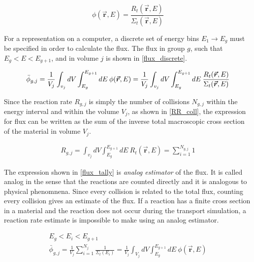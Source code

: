 \begin{equation}
\label{flux_from_RR}
\phi(\boldsymbol{\vec{r}},E) = \frac{ R_t(\boldsymbol{\vec{r}},E) }{  \Sigma_t(\boldsymbol{\vec{r}},E) }
\end{equation}

For a representation on a computer, a discrete set of energy bins $E_1 \rightarrow E_g$ must be specified in order to calculate the flux.  The flux in group $g$, such that $E_g < E < E_{g+1}$, and in volume $j$ is shown in \eqref{flux_discrete}.

\begin{equation}
\label{flux_discrete}
\bar{\phi}_{g,j} = \frac{1}{V_j} \int_{v_j} dV \int_{E_g}^{E_{g+1}} dE \: \phi(\boldsymbol{\vec{r}},E) = \frac{1}{V_j} \int_{v_j} dV \int_{E_g}^{E_{g+1}} dE \:\frac{ R_t(\boldsymbol{\vec{r}},E) }{  \Sigma_t(\boldsymbol{\vec{r}},E) } \\
\end{equation}

Since the reaction rate $R_{g,j}$ is simply the number of collisions $N_{g,j}$ within the energy interval and within the volume $V_j$, as shown in \eqref{RR_coll}, the expression for flux can be written as the sum of the inverse total macroscopic cross section of the material in volume $V_j$.

\begin{equation}
\label{RR_coll}
\begin{gathered}
R_{g,j} = \int_{v_j} dV \int_{E_g}^{E_{g+1}} dE \: R_t(\boldsymbol{\vec{r}},E) = \sum_{i=1}^{N_{g,j}} 1
\end{gathered}
\end{equation}

The expression shown in \eqref{flux_tally} is \emph{analog estimator} of the flux.  It is called analog in the sense that the reactions are counted directly and it is analogous to physical phenomnena.  Since every collision is related to the total flux, counting every collision gives an estimate of the flux.  If a reaction has a finite cross section in a material and the reaction does not occur during the transport simulation, a reaction rate estimate is impossible to make using an analog estimator. 

\begin{equation}
\label{flux_tally}
\begin{gathered}
E_g < E_i < E_{g+1} \\
\bar{\phi}_{g,j} =  \frac{1}{V_j} \sum_{i=1}^{N_j} \frac{1}{\Sigma_t(E_i)} =  \frac{1}{V_j} \int_{V_j} dV \int_{E_g}^{E_{g+1}} dE \: \phi(\boldsymbol{\vec{r}},E) 
\end{gathered}
\end{equation}

